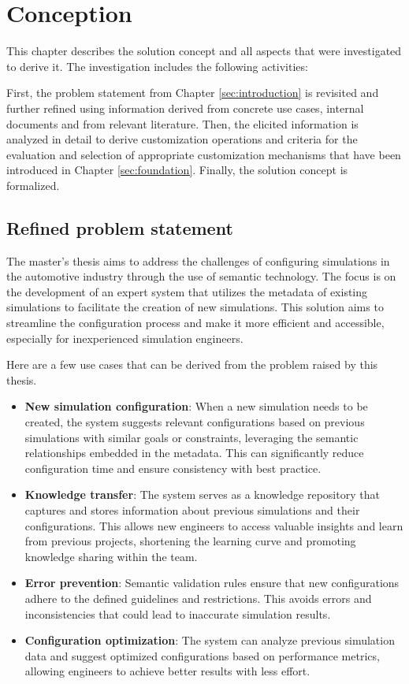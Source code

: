 \section{Conception\label{sec:conception}}

This chapter describes the solution concept and all aspects that were investigated to derive it.
The investigation includes the following activities:

First, the problem statement from Chapter \ref{sec:introduction} is revisited and further refined using information derived from concrete use cases, internal documents and from relevant literature.
Then, the elicited information is analyzed in detail to derive customization operations and criteria for the evaluation and selection of appropriate customization mechanisms that have been introduced in Chapter \ref{sec:foundation}. Finally, the solution concept is formalized.


\subsection{Refined problem statement}
The master's thesis aims to address the challenges of configuring simulations in the automotive industry through the use of semantic technology. The focus is on the development of an expert system that utilizes the metadata of existing simulations to facilitate the creation of new simulations. This solution aims to streamline the configuration process and make it more efficient and accessible, especially for inexperienced simulation engineers.

Here are a few use cases that can be derived from the problem raised by this thesis.

\begin{itemize}
    \item \textbf{New simulation configuration}: When a new simulation needs to be created, the system suggests relevant configurations based on previous simulations with similar goals or constraints, leveraging the semantic relationships embedded in the metadata. This can significantly reduce configuration time and ensure consistency with best practice.
    \item \textbf{Knowledge transfer}: The system serves as a knowledge repository that captures and stores information about previous simulations and their configurations. This allows new engineers to access valuable insights and learn from previous projects, shortening the learning curve and promoting knowledge sharing within the team.
    \item \textbf{Error prevention}: Semantic validation rules ensure that new configurations adhere to the defined guidelines and restrictions. This avoids errors and inconsistencies that could lead to inaccurate simulation results.
    \item \textbf{Configuration optimization}: The system can analyze previous simulation data and suggest optimized configurations based on performance metrics, allowing engineers to achieve better results with less effort.
\end{itemize}


